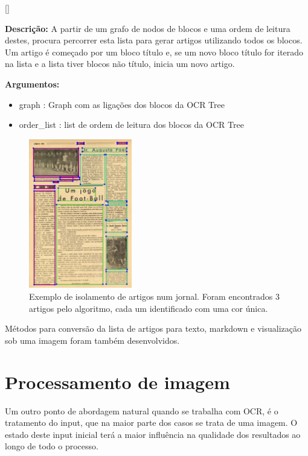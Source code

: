 [\normalsize]

\textbf{Descrição:} A partir de um grafo de nodos de blocos e uma ordem de leitura destes, procura percorrer esta lista para gerar artigos utilizando todos os blocos. Um artigo é começado por um bloco título e, se um novo bloco título for iterado na lista e a lista tiver blocos não título, inicia um novo artigo.

\textbf{Argumentos:}
\begin{itemize}\setlength\itemsep{-0.3em}
	\item graph : Graph com as ligações dos blocos da OCR Tree
	\item order\_list : list de ordem de leitura dos blocos da OCR Tree
\end{itemize}


\begin{figure}[H]
	\centering
	\includegraphics[width=0.4\textwidth]{images/ilustracoes/extract_articles_example.png}
	\caption{Exemplo de isolamento de artigos num jornal. Foram encontrados 3 artigos pelo algoritmo, cada um identificado com uma cor única.}
	\label{fig:extract_articles_example}
\end{figure}

Métodos para conversão da lista de artigos para texto, markdown e visualização sob uma imagem foram também desenvolvidos.



\section{Processamento de imagem}
\label{contribution_image_processing}


Um outro ponto de abordagem natural quando se trabalha com OCR, é o tratamento do input, que na maior parte dos casos se trata de uma imagem. O estado deste input inicial terá a maior influência na qualidade dos resultados ao longo de todo o processo.

